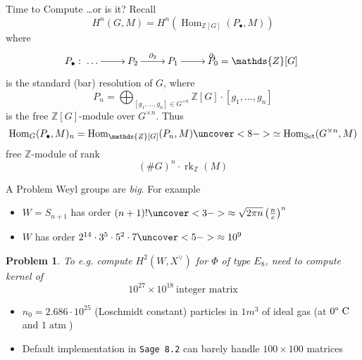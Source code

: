 \documentclass[pdf]{beamer}
\newcommand{\op}[1]{\operatorname{#1}}
\newcommand{\bbf}[1]{\mathds{#1}}
\newcommand{\Z}{\bbf{Z}}
\newtheorem*{problem*}{Problem}
\begin{document}
\begin{frame}{Time to Compute}
   \pause \dots or is it? \pause Recall\pause
   \[ H^n(G,M) = H^n(\op{Hom}_{\Z[G]}(P_\bullet{},M)) \]
   \pause where
   \[ P_\bullet{}: \xymatrix{\dots \ar[r] & P_2 \ar[r]^{\partial_2} & P_1 \ar[r]^{\partial_1} & P_0 = \Z[G] } \]
   is the standard (bar) resolution of $G$\pause , where
   \[ P_n = \bigoplus_{[g_1,\dots,g_n] \in G^{\times n}} \Z[G]\cdot{}[g_1,\dots,g_n] \]
   is the free $\Z[G]$-module over $G^{\times n}$. \pause Thus 
   \[ \op{Hom}_G(P_\bullet{},M)_n = \op{Hom}_{\Z[G]}(P_n,M) \uncover<8->{\simeq \op{Hom}_{\op{Set}}(G^{\times n}, M)} \]
   \pause[9] free $\Z$-module \pause of rank
   \[ (\# G)^n \cdot{} \op{rk}_\Z(M) \]
\end{frame}

\begin{frame}{A Problem}
   Weyl groups are \textit{big}. \pause For example
   \begin{itemize}
      \item<2->[$A_n$:] $W = S_{n+1}$ has order $(n+1)! \uncover<3->{\approx \sqrt{2\pi n}\left(\frac{n}{e}\right)^n}$
      \item<4->[$E_8$:] $W$ has order $2^{14}\cdot{}3^5\cdot{}5^2\cdot 7 \uncover<5->{ \approx 10^9}$
   \end{itemize}
   \pause[6] \begin{problem*}To e.g. compute $H^2(W,X^\vee)$ for $\Phi$ of type $E_8$, need to compute kernel of
   \[ 10^{27} \times 10^{18}\ \text{integer matrix} \]
   \end{problem*}
   \begin{itemize}
      \item<7-> $n_0 = 2.686 \cdot 10^{25}$ (Loschmidt constant) particles in $1 m^3$ of ideal gas (at $0 \text{\textdegree\ C}$ and $1 \op{atm}$)
      \item<8-> Default implementation in \texttt{Sage 8.2} can barely handle $100 \times 100$ matrices
   \end{itemize}
\end{frame}
\end{document}
